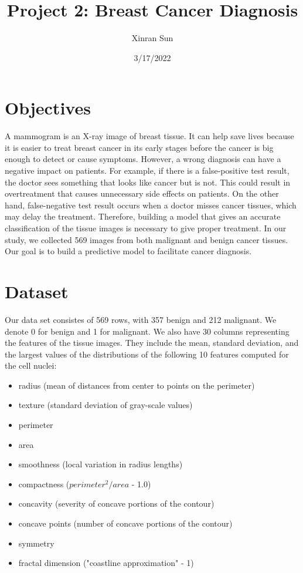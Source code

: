 \documentclass[
]{article}
\title{Project 2: Breast Cancer Diagnosis}
\author{Xinran Sun}
\date{3/17/2022}
\begin{document}
\maketitle

\hypertarget{objectives}{%
\section{Objectives}\label{objectives}}

A mammogram is an X-ray image of breast tissue. It can help save lives
because it is easier to treat breast cancer in its early stages before
the cancer is big enough to detect or cause symptoms. However, a wrong
diagnosis can have a negative impact on patients. For example, if there
is a false-positive test result, the doctor sees something that looks
like cancer but is not. This could result in overtreatment that causes
unnecessary side effects on patients. On the other hand, false-negative
test result occurs when a doctor misses cancer tissues, which may delay
the treatment. Therefore, building a model that gives an accurate
classification of the tissue images is necessary to give proper
treatment. In our study, we collected 569 images from both malignant and
benign cancer tissues. Our goal is to build a predictive model to
facilitate cancer diagnosis.

\hypertarget{dataset}{%
\section{Dataset}\label{dataset}}

Our data set consistes of 569 rows, with 357 benign and 212 malignant.
We denote 0 for benign and 1 for malignant. We also have 30 columns
representing the features of the tissue images. They include the mean,
standard deviation, and the largest values of the distributions of the
following 10 features computed for the cell nuclei:

\begin{itemize}
\item radius (mean of distances from center to points on the perimeter)
\item texture (standard deviation of gray-scale values)
\item perimeter
\item area
\item smoothness (local variation in radius lengths)
\item compactness ($perimeter^2/area$ - 1.0)
\item concavity (severity of concave portions of the contour)
\item concave points (number of concave portions of the contour)
\item symmetry
\item fractal dimension ("coastline approximation" - 1)
\end{itemize}
\end{document}
